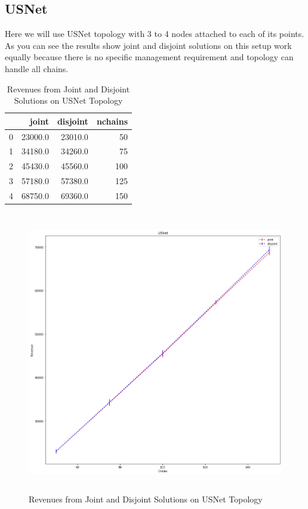 \subsection{USNet}
Here we will use USNet topology with 3 to 4 nodes attached to each of its points.
As you can see the results show joint and disjoint solutions on this setup work equally because there is no specific
management requirement and topology can handle all chains.

\begin{table}[H]
    \caption{Revenues from Joint and Disjoint Solutions on USNet Topology}
    \label{tbl:joint-vs-disjoin-usnet}
    \medskip
    \centering
    \begin{tabular}{lrrr}
        \toprule
        {} &    joint &  disjoint &  nchains \\
        \midrule
        0 &  23000.0 &   23010.0 &       50 \\
        1 &  34180.0 &   34260.0 &       75 \\
        2 &  45430.0 &   45560.0 &      100 \\
        3 &  57180.0 &   57380.0 &      125 \\
        4 &  68750.0 &   69360.0 &      150 \\
        \bottomrule
    \end{tabular}
\end{table}

\begin{figure}[H]
    \centering
    \includegraphics[height=350pt]{plots/joint-vs-disjoint-usnet.png}
    \caption{Revenues from Joint and Disjoint Solutions on USNet Topology}
    \label{fig:joint-vs-disjoint-usnet}
\end{figure}
